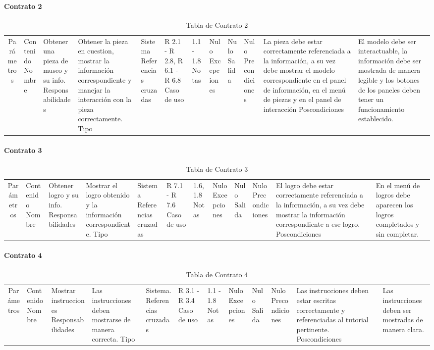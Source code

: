 \paragraph{Contrato 2} 
\begin{longtable}{|c|p{7cm}|}
\hline 
Parámetros & Contenido
\hline
Nombre & Obtener una pieza de museo y su info.
\hline
Responsabilidades & Obtener la pieza en cuestion, mostrar la información correspondiente y manejar la interacción con la pieza correctamente.
\hline
Tipo & Sistema
\hline
Referencias cruzadas & R 2.1 - R 2.8, R 6.1 - R 6.8
\hline
Caso de uso & 1.1 - 1.8
\hline
Notas & Nulo
\hline
Excepciones & Nulo
\hline
Salida & Nulo
\hline
Precondiciones & La pieza debe estar correctamente referenciada a la información, a su vez debe mostrar el modelo correspondiente en el panel de información, en el menú de piezas y en el panel de interacción
\hline
Poscondiciones &El modelo debe ser interactuable, la información debe ser mostrada de manera legible y los botones de los paneles deben tener un funcionamiento establecido. 
\hline
\caption{Tabla de Contrato 2}
\label{tabCont2}\\
\end{longtable}

\paragraph{Contrato 3} 
\begin{longtable}{|c|p{7cm}|}
\hline 
Parámetros & Contenido
\hline
Nombre & Obtener logro y su info.
\hline
Responsabilidades & Mostrar el logro obtenido y la información correspondiente.
\hline
Tipo & Sistema
\hline
Referencias cruzadas & R 7.1 - R 7.6
\hline
Caso de uso & 1.6, 1.8
\hline
Notas & Nulo
\hline
Excepciones & Nulo
\hline
Salida & Nulo
\hline
Precondiciones &  El logro debe estar correctamente referenciada a la información, a su vez debe mostrar la información correspondiente a ese logro.
\hline
Poscondiciones & En el menú de logros debe aparecen los logros completados y sin completar.
\hline
\caption{Tabla de Contrato 3}
\label{tabCont3}\\
\end{longtable}

\paragraph{Contrato 4} 
\begin{longtable}{|c|p{7cm}|}
\hline 
Parámetros & Contenido
\hline
Nombre & Mostrar instrucciones
\hline
Responsabilidades & Las instrucciones deben mostrarse de manera correcta.
\hline
Tipo & Sistema.
\hline
Referencias cruzadas & R 3.1 - R 3.4
\hline
Caso de uso &  1.1 - 1.8
\hline
Notas & Nulo
\hline
Excepciones & Nulo
\hline
Salida & Nulo
\hline
Precondiciones & Las instrucciones deben estar escritas correctamente y referenciadas al tutorial pertinente.
\hline
Poscondiciones &Las instrucciones deben ser mostradas de manera clara.
\hline
\caption{Tabla de Contrato 4}
\label{tabCont4}\\
\end{longtable}

